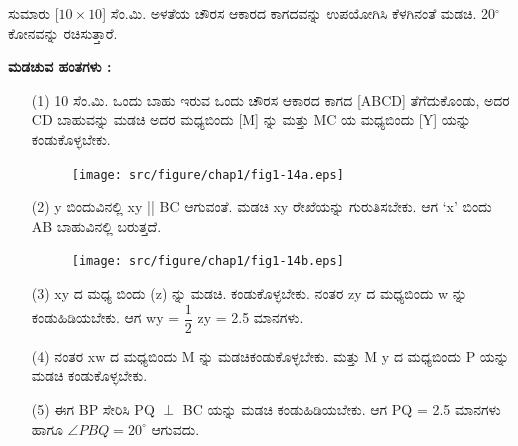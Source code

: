 ಸುಮಾರು [$10 \times 10$] ಸೆಂ.ಮಿ. ಅಳತೆಯ ಚೌರಸ ಆಕಾರದ ಕಾಗದವನ್ನು ಉಪಯೋಗಿಸಿ ಕೆಳಗಿನಂತೆ ಮಡಚಿ.  20$^\circ$ ಕೋನವನ್ನು ರಚಿಸುತ್ತಾರೆ. 

\noindent
\textbf{ಮಡಚುವ ಹಂತಗಳು :}
\begin{enumerate}
\item[(1)] 10 ಸೆಂ.ಮಿ. ಒಂದು ಬಾಹು ಇರುವ ಒಂದು ಚೌರಸ ಆಕಾರದ ಕಾಗದ  [ABCD] ತೆಗೆದುಕೊಂಡು, ಅದರ CD ಬಾಹುವನ್ನು ಮಡಚಿ ಅದರ ಮಧ್ಯಬಿಂದು [M] ನ್ನು ಮತ್ತು MC ಯ ಮಧ್ಯಬಿಂದು [Y] ಯನ್ನು ಕಂಡುಕೊಳ್ಳಬೇಕು. 
\begin{figure}[H]
\centering
\texttt{[image: src/figure/chap1/fig1-14a.eps]}
\end{figure}

\item[(2)] y ಬಿಂದುವಿನಲ್ಲಿ  xy || BC ಆಗುವಂತೆ. ಮಡಚಿ xy ರೇಖೆಯನ್ನು ಗುರುತಿಸಬೇಕು. ಆಗ `x' ಬಿಂದು AB ಬಾಹುವಿನಲ್ಲಿ ಬರುತ್ತದೆ. 
\begin{figure}[H]
\centering
\texttt{[image: src/figure/chap1/fig1-14b.eps]}
\end{figure}

\item[(3)] xy ದ ಮಧ್ಯ ಬಿಂದು (z) ನ್ನು ಮಡಚಿ. ಕಂಡುಕೊಳ್ಳಬೇಕು. ನಂತರ zy ದ ಮಧ್ಯಬಿಂದು w ನ್ನು ಕಂಡುಹಿಡಿಯಬೇಕು. ಆಗ wy = $\dfrac{1}{2}$ zy = 2.5 ಮಾನಗಳು.

\item[(4)] ನಂತರ xw ದ ಮಧ್ಯಬಿಂದು M ನ್ನು ಮಡಚಿಕಂಡುಕೊಳ್ಳಬೇಕು. ಮತ್ತು M y ದ ಮಧ್ಯಬಿಂದು  P ಯನ್ನು ಮಡಚಿ ಕಂಡುಕೊಳ್ಳಬೇಕು.

\item[(5)] ಈಗ BP ಸೇರಿಸಿ PQ $\perp$ BC ಯನ್ನು ಮಡಚಿ ಕಂಡುಹಿಡಿಯಬೇಕು. ಆಗ PQ = 2.5 ಮಾನಗಳು ಹಾಗೂ  $\angle PBQ = 20^\circ$ ಆಗುವದು.  
\end{enumerate}

